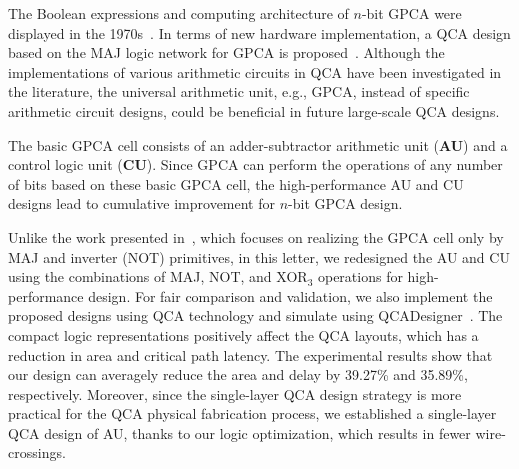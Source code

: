 \documentclass[9pt,journal,compsoc]{IEEEtran}
\begin{document}
The Boolean expressions and computing architecture of $n$-bit GPCA were displayed in the 1970s~\cite{4}.
In terms of new hardware implementation, a QCA design based on the MAJ logic network for GPCA is proposed~\cite{2}.
Although the implementations of various arithmetic circuits in QCA have been investigated in the literature, 
the universal arithmetic unit, e.g., GPCA, instead of specific arithmetic circuit designs, could be beneficial in future large-scale QCA designs.  

The basic GPCA cell consists of an adder-subtractor arithmetic unit (\textbf{AU}) and a control logic unit (\textbf{CU}). 
Since GPCA can perform the operations of any number of bits based on these basic GPCA cell, the high-performance AU and CU designs lead to cumulative improvement for $n$-bit GPCA design. 

Unlike the work presented in~\cite{2}, which focuses on realizing the GPCA cell only by MAJ and inverter (NOT) primitives, in this letter, we redesigned the AU and CU using the combinations of MAJ, NOT, and XOR$_3$ operations for high-performance design. 
For fair comparison and validation, we also implement the proposed designs using QCA technology and simulate using QCADesigner~\cite{QCAdesigner}.
The compact logic representations positively affect the QCA layouts, which has a reduction in area and critical path latency.
The experimental results show that our design can averagely reduce the area and delay by 39.27\% and 35.89\%, respectively. Moreover, since the single-layer QCA design strategy is more practical for the QCA physical fabrication process, we established a single-layer QCA design of AU, thanks to our logic optimization, which results in fewer wire-crossings.


\end{document}
